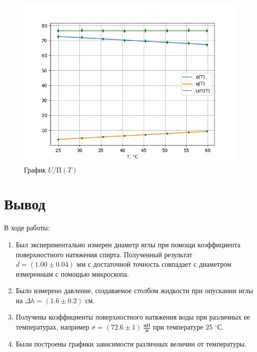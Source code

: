 \documentclass[a4paper,12pt]{article}
\theoremstyle{definition}
\begin{document}
    \begin{figure}[h!]
            \centering
            \includegraphics[scale=0.9]{all.png}
            \caption{График $U/П(T)$}
            \label{graph}
    \end{figure}
\newpage
	\section{Вывод}
	В ходе работы:
	\begin{enumerate}
		\item Был экспериментально измерен диаметр иглы при помощи коэффициента поверхностного натяжения спирта. Полученный результат $d = (1.00\pm 0.04)\text{ мм}$ с достаточной точность совпадает с диаметром измеренным с помощью микроскопа.
		\item Было измерено давление, создаваемое столбом жидкости при опускании иглы на $\Delta h = (1.6\pm 0.2)$ см.
		\item Получены коэффициенты поверхностного натяжения воды при различных ее температурах, например $\sigma = (72.6\pm 1)\:\frac{\text{мН}}{\text{м}}$ при температуре 25 $^\circ$С.
		\item Были построены графики зависимости различных величин от температуры.
	\end{enumerate}
\end{document}
